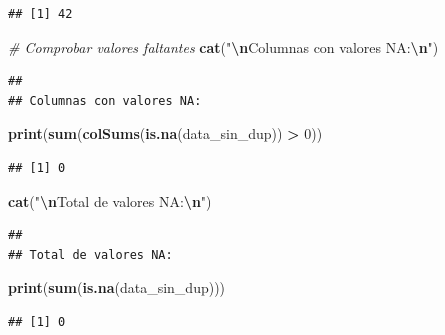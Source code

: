 \documentclass[
]{article}
\newenvironment{Shaded}{\begin{snugshade}}{\end{snugshade}}
\newcommand{\CommentTok}[1]{\textcolor[rgb]{0.56,0.35,0.01}{\textit{#1}}}
\newcommand{\DecValTok}[1]{\textcolor[rgb]{0.00,0.00,0.81}{#1}}
\newcommand{\FunctionTok}[1]{\textcolor[rgb]{0.13,0.29,0.53}{\textbf{#1}}}
\newcommand{\NormalTok}[1]{#1}
\newcommand{\SpecialCharTok}[1]{\textcolor[rgb]{0.81,0.36,0.00}{\textbf{#1}}}
\newcommand{\StringTok}[1]{\textcolor[rgb]{0.31,0.60,0.02}{#1}}
\begin{document}
\begin{verbatim}
## [1] 42
\end{verbatim}

\begin{Shaded}
\begin{Highlighting}[]
\CommentTok{\# Comprobar valores faltantes}
\FunctionTok{cat}\NormalTok{(}\StringTok{"}\SpecialCharTok{\textbackslash{}n}\StringTok{Columnas con valores NA:}\SpecialCharTok{\textbackslash{}n}\StringTok{"}\NormalTok{)}
\end{Highlighting}
\end{Shaded}

\begin{verbatim}
## 
## Columnas con valores NA:
\end{verbatim}

\begin{Shaded}
\begin{Highlighting}[]
\FunctionTok{print}\NormalTok{(}\FunctionTok{sum}\NormalTok{(}\FunctionTok{colSums}\NormalTok{(}\FunctionTok{is.na}\NormalTok{(data\_sin\_dup)) }\SpecialCharTok{\textgreater{}} \DecValTok{0}\NormalTok{))}
\end{Highlighting}
\end{Shaded}

\begin{verbatim}
## [1] 0
\end{verbatim}

\begin{Shaded}
\begin{Highlighting}[]
\FunctionTok{cat}\NormalTok{(}\StringTok{"}\SpecialCharTok{\textbackslash{}n}\StringTok{Total de valores NA:}\SpecialCharTok{\textbackslash{}n}\StringTok{"}\NormalTok{)}
\end{Highlighting}
\end{Shaded}

\begin{verbatim}
## 
## Total de valores NA:
\end{verbatim}

\begin{Shaded}
\begin{Highlighting}[]
\FunctionTok{print}\NormalTok{(}\FunctionTok{sum}\NormalTok{(}\FunctionTok{is.na}\NormalTok{(data\_sin\_dup)))}
\end{Highlighting}
\end{Shaded}

\begin{verbatim}
## [1] 0
\end{verbatim}
\end{document}
